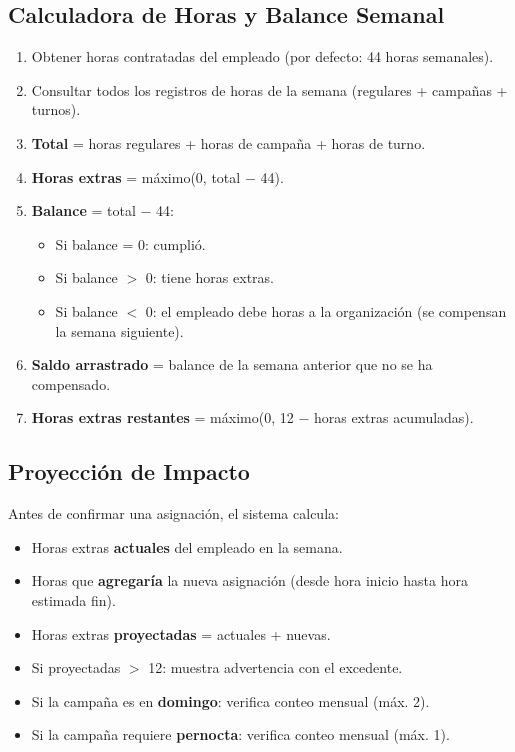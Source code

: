 \documentclass[10pt,a4paper]{article}
\begin{document}
\subsection{Calculadora de Horas y Balance Semanal}

\begin{enumerate}[leftmargin=2em]
    \item Obtener horas contratadas del empleado (por defecto: 44 horas semanales).
    \item Consultar todos los registros de horas de la semana (regulares + campañas + turnos).
    \item \textbf{Total} = horas regulares + horas de campaña + horas de turno.
    \item \textbf{Horas extras} = m\'{a}ximo(0, total $-$ 44).
    \item \textbf{Balance} = total $-$ 44:
    \begin{itemize}
        \item Si balance = 0: cumpli\'{o}.
        \item Si balance $>$ 0: tiene horas extras.
        \item Si balance $<$ 0: el empleado debe horas a la organizaci\'{o}n (se compensan la semana siguiente).
    \end{itemize}
    \item \textbf{Saldo arrastrado} = balance de la semana anterior que no se ha compensado.
    \item \textbf{Horas extras restantes} = m\'{a}ximo(0, 12 $-$ horas extras acumuladas).
\end{enumerate}

\subsection{Proyecci\'{o}n de Impacto}

Antes de confirmar una asignaci\'{o}n, el sistema calcula:
\begin{itemize}[leftmargin=2em]
    \item Horas extras \textbf{actuales} del empleado en la semana.
    \item Horas que \textbf{agregar\'{i}a} la nueva asignaci\'{o}n (desde hora inicio hasta hora estimada fin).
    \item Horas extras \textbf{proyectadas} = actuales + nuevas.
    \item Si proyectadas $>$ 12: muestra advertencia con el excedente.
    \item Si la campaña es en \textbf{domingo}: verifica conteo mensual (m\'{a}x. 2).
    \item Si la campaña requiere \textbf{pernocta}: verifica conteo mensual (m\'{a}x. 1).
\end{itemize}
\end{document}
